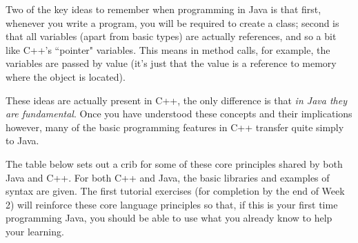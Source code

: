 \documentclass[twoside=false,DIV=14]{scrartcl}
\begin{document}
\vspace{0.5cm}

Two of the key ideas to remember when programming in Java is that first, whenever you write a program, you will be required to create a class; second is that all variables (apart from basic types) 
are actually references, and so a bit like C++'s ``pointer" variables.  This means in method calls, for example, the variables are passed by value (it's just that the value is a reference to memory where the object is located). 

These ideas are actually present in C++, the only difference is that \emph{in Java they are fundamental}. Once you have understood these concepts and their implications however, many of the basic programming features in C++ transfer quite simply to Java.

The table below sets out a crib for some of these core principles shared by both Java and C++. For both C++ and Java, the basic libraries and examples of syntax are given. The first tutorial exercises (for completion by the end of Week 2) will reinforce these core language principles so that, if this is your first time programming Java, you should be able to use what you already know to help your learning.
\end{document}
